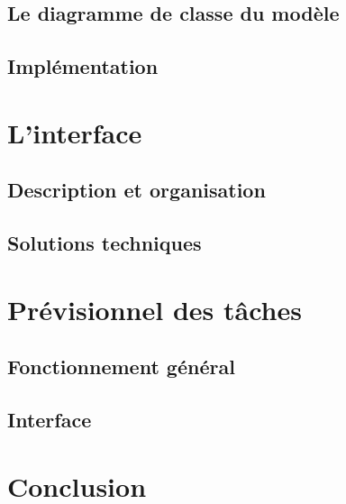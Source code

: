 \documentclass[11pt]{report}
\begin{document}
	\section{Le diagramme de classe du modèle}

	\section{Implémentation}

\chapter{L'interface}

	\section{Description et organisation}

	\section{Solutions techniques}

\chapter{Prévisionnel des tâches}

	\section{Fonctionnement général}

	\section{Interface}

\chapter{Conclusion}
\end{document}
